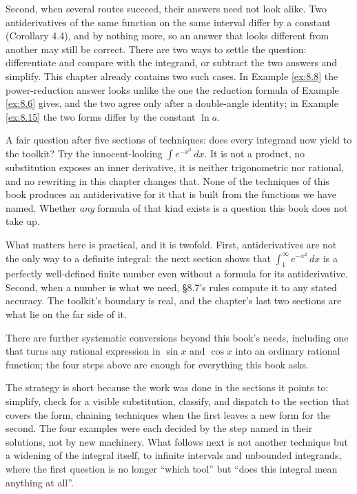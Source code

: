 \documentclass[a4paper,12pt,oneside]{memoir}
\begin{document}
Second, when several routes succeed, their answers need not look alike. Two antiderivatives of the same function on the same interval differ by a constant (Corollary 4.4), and by nothing more, so an answer that looks different from another may still be correct. There are two ways to settle the question: differentiate and compare with the integrand, or subtract the two answers and simplify. This chapter already contains two such cases. In Example \ref{ex:8.8} the power-reduction answer looks unlike the one the reduction formula of Example \ref{ex:8.6} gives, and the two agree only after a double-angle identity; in Example \ref{ex:8.15} the two forms differ by the constant \(\ln a\).

A fair question after five sections of techniques: does every integrand now yield to the toolkit? Try the innocent-looking \(\int e^{-x^{2}}\,dx\). It is not a product, no substitution exposes an inner derivative, it is neither trigonometric nor rational, and no rewriting in this chapter changes that. None of the techniques of this book produces an antiderivative for it that is built from the functions we have named. Whether \emph{any} formula of that kind exists is a question this book does not take up.

What matters here is practical, and it is twofold. First, antiderivatives are not the only way to a definite integral: the next section shows that \(\int_{1}^{\infty} e^{-x^{2}}\,dx\) is a perfectly well-defined finite number even without a formula for its antiderivative. Second, when a number is what we need, §8.7’s rules compute it to any stated accuracy. The toolkit’s boundary is real, and the chapter’s last two sections are what lie on the far side of it.

There are further systematic conversions beyond this book’s needs, including one that turns any rational expression in \(\sin x\) and \(\cos x\) into an ordinary rational function; the four steps above are enough for everything this book asks.

The strategy is short because the work was done in the sections it points to: simplify, check for a visible substitution, classify, and dispatch to the section that covers the form, chaining techniques when the first leaves a new form for the second. The four examples were each decided by the step named in their solutions, not by new machinery. What follows next is not another technique but a widening of the integral itself, to infinite intervals and unbounded integrands, where the first question is no longer “which tool” but “does this integral mean anything at all”.
\end{document}
